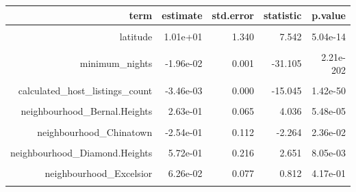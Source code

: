 \documentclass[justified, 11pt]{scrartcl}\usepackage[]{graphicx}\usepackage[]{xcolor}
\newenvironment{knitrout}{}{} %
\begin{document}
\begin{knitrout}
\begin{table}
\begin{tabular}{r|r|r|r|r}
\hline
term & estimate & std.error & statistic & p.value\\
\hline
\cellcolor{gray!6}{(Intercept)} & \cellcolor{gray!6}{1.59e+02} & \cellcolor{gray!6}{136.888} & \cellcolor{gray!6}{1.163} & \cellcolor{gray!6}{2.45e-01}\\
\hline
latitude & 1.01e+01 & 1.340 & 7.542 & 5.04e-14\\
\hline
\cellcolor{gray!6}{longitude} & \cellcolor{gray!6}{4.37e+00} & \cellcolor{gray!6}{0.972} & \cellcolor{gray!6}{4.498} & \cellcolor{gray!6}{6.94e-06}\\
\hline
minimum\_nights & -1.96e-02 & 0.001 & -31.105 & 2.21e-202\\
\hline
\cellcolor{gray!6}{number\_of\_reviews} & \cellcolor{gray!6}{-1.34e-03} & \cellcolor{gray!6}{0.000} & \cellcolor{gray!6}{-18.560} & \cellcolor{gray!6}{1.44e-75}\\
\hline
calculated\_host\_listings\_count & -3.46e-03 & 0.000 & -15.045 & 1.42e-50\\
\hline
\cellcolor{gray!6}{availability\_365} & \cellcolor{gray!6}{-9.66e-05} & \cellcolor{gray!6}{0.000} & \cellcolor{gray!6}{-1.875} & \cellcolor{gray!6}{6.09e-02}\\
\hline
neighbourhood\_Bernal.Heights & 2.63e-01 & 0.065 & 4.036 & 5.48e-05\\
\hline
\cellcolor{gray!6}{neighbourhood\_Castro.Upper.Market} & \cellcolor{gray!6}{3.88e-01} & \cellcolor{gray!6}{0.087} & \cellcolor{gray!6}{4.448} & \cellcolor{gray!6}{8.75e-06}\\
\hline
neighbourhood\_Chinatown & -2.54e-01 & 0.112 & -2.264 & 2.36e-02\\
\hline
\cellcolor{gray!6}{neighbourhood\_Crocker.Amazon} & \cellcolor{gray!6}{4.23e-01} & \cellcolor{gray!6}{0.092} & \cellcolor{gray!6}{4.582} & \cellcolor{gray!6}{4.66e-06}\\
\hline
neighbourhood\_Diamond.Heights & 5.72e-01 & 0.216 & 2.651 & 8.05e-03\\
\hline
\cellcolor{gray!6}{neighbourhood\_Downtown.Civic.Center} & \cellcolor{gray!6}{-2.48e-01} & \cellcolor{gray!6}{0.096} & \cellcolor{gray!6}{-2.585} & \cellcolor{gray!6}{9.75e-03}\\
\hline
neighbourhood\_Excelsior & 6.26e-02 & 0.077 & 0.812 & 4.17e-01\\
\hline
\cellcolor{gray!6}{neighbourhood\_Financial.District} & \cellcolor{gray!6}{-1.42e-01} & \cellcolor{gray!6}{0.104} & \cellcolor{gray!6}{-1.369} & \cellcolor{gray!6}{1.71e-01}\\

\end{tabular}
\end{table}
\end{knitrout}
\end{document}
